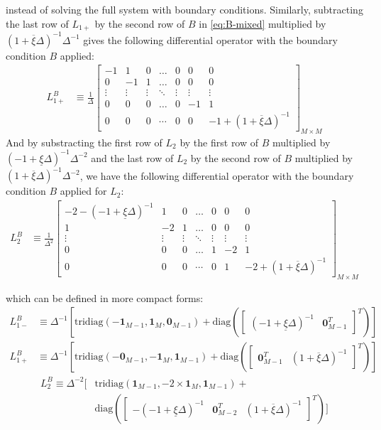 \documentclass[11pt]{article}
\newcommand{\diag}{\ensuremath{\mathrm{diag}}}
\theoremstyle{definition}
\begin{document}
instead of solving the full system with boundary conditions. Similarly, subtracting the last row of $L_{1+}$ by the second row of $B$ in \eqref{eq:B-mixed} multiplied by $(1 + \overline{\xi} \Delta )^{-1} \Delta^{-1}$ gives the following differential operator with the boundary condition $B$ applied:
\begin{align}
L_{1+}^B &\equiv \frac{1}{\Delta}\begin{bmatrix}
-1&1&0&\dots&0&0&0\\
0&-1&1&\dots&0&0&0\\
\vdots&\vdots&\vdots&\ddots&\vdots&\vdots&\vdots\\
0&0&0&\dots&0&-1&1\\
0&0&0&\cdots&0&0&-1+(1+\overline{\xi} \Delta)^{-1}
\end{bmatrix}_{M\times M}\label{eq:L-1-plus-regular}
\end{align}
And by substracting the first row of $L_2$ by the first row of $B$ multiplied by $(-1 + \underline{\xi} \Delta )^{-1} \Delta^{-2}$ and the last row of $L_2$ by the second row of $B$ multiplied by $(1 + \overline{\xi} \Delta)^{-1} \Delta^{-2}$, we have the following differential operator with the boundary condition $B$ applied for $L_2$:
\begin{align}
L_2^B &\equiv \frac{1}{\Delta^2}\begin{bmatrix}
-2 - (-1 + \underline{\xi}\Delta)^{-1} &1&0&\dots&0&0&0\\
1&-2&1&\dots&0&0&0\\
\vdots&\vdots&\vdots&\ddots&\vdots&\vdots&\vdots\\
0&0&0&\dots&1&-2&1\\
0&0&0&\cdots&0&1&-2 +(1+ \overline{\xi}\Delta)^{-1}
\end{bmatrix}_{M\times M}\label{eq:L-2-regular}
\end{align}

which can be defined in more compact forms:
\begin{align}
L_{1-}^B &\equiv \Delta^{-1}
\left[ 
\text{tridiag}(-\mathbf{1}_{M-1}, 
\mathbf{1}_{M}, \mathbf{0}_{M-1} ) + \diag \left( \begin{bmatrix}
(-1+\underline{\xi} \Delta)^{-1} &
\mathbf{0}_{M-1}^T 
\end{bmatrix}^T
\right)
\right]
\end{align}
\begin{align}
L_{1+}^B &\equiv 
\Delta^{-1}
\left[ 
\text{tridiag}(-\mathbf{0}_{M-1}, 
\mathbf{-1}_{M}, \mathbf{1}_{M-1} ) + \diag \left( \begin{bmatrix}
\mathbf{0}_{M-1}^T &
(1+\overline{\xi} \Delta)^{-1}
\end{bmatrix}^T
\right)
\right]
\end{align}
\begin{align}
L_2^B \equiv  \Delta^{-2} 
\Big[ 
&\text{tridiag}(
\mathbf{1}_{M-1},
-2 \times \mathbf{1}_M,
\mathbf{1}_{M-1} )
+ \\
&\diag \left( \begin{bmatrix}
-(-1+\underline{\xi} \Delta)^{-1}&
\mathbf{0}_{M-2}^T &
(1+\overline{\xi} \Delta)^{-1}
\end{bmatrix}^T \right)
\Big]
\end{align}
\end{document}
